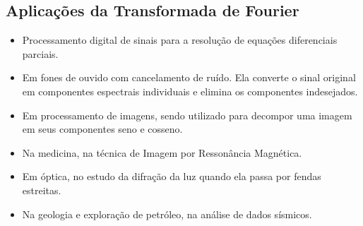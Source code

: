 \subsection{Aplicações da Transformada de Fourier}
\begin{itemize}
\item Processamento digital de sinais para a resolução de equações diferenciais parciais.
\item Em fones de ouvido com cancelamento de ruído. Ela converte o sinal original em componentes espectrais individuais e elimina os componentes indesejados.
\item Em processamento de imagens, sendo utilizado para decompor uma imagem em seus componentes seno e cosseno.
\item Na medicina, na técnica de Imagem por Ressonância Magnética.
\item Em óptica, no estudo da difração da luz quando ela passa por fendas estreitas. 
\item Na geologia e exploração de petróleo, na análise de dados sísmicos.
\end{itemize}